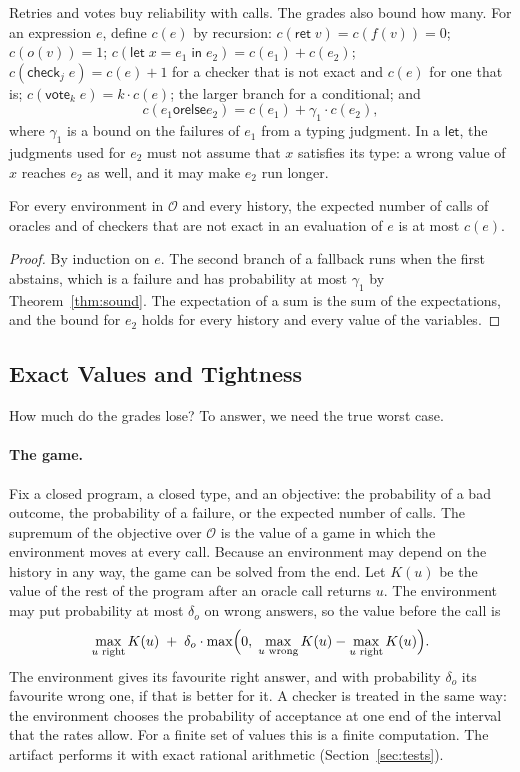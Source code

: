 \documentclass[acmsmall,nonacm,screen]{acmart}
\newcommand{\kw}[1]{\mathsf{#1}}
\newcommand{\ret}{\kw{ret}}
\newcommand{\letin}[3]{\kw{let}\;#1 = #2\;\kw{in}\;#3}
\newcommand{\chk}[2]{\kw{check}_{#1}\;#2}
\newcommand{\vote}[2]{\kw{vote}_{#1}\;#2}
\newcommand{\orelse}{\mathbin{\kw{orelse}}}
\newcommand{\cO}{\mathcal{O}}
\begin{document}
Retries and votes buy reliability with calls. The grades also bound how many. For an
expression $e$, define $c(e)$ by recursion: $c(\ret\;v) = c(f(v)) = 0$; $c(o(v)) = 1$;
$c(\letin{x}{e_1}{e_2}) = c(e_1) + c(e_2)$; $c(\chk{j}{e}) = c(e) + 1$ for a checker that is
not exact and $c(e)$ for one that is; $c(\vote{k}{e}) = k \cdot c(e)$; the larger branch for
a conditional; and
\[
c(e_1 \orelse e_2) = c(e_1) + \gamma_1 \cdot c(e_2),
\]
where $\gamma_1$ is a bound on the failures of $e_1$ from a typing judgment. In a
$\kw{let}$, the judgments used for $e_2$ must not assume that $x$ satisfies its type: a wrong
value of $x$ reaches $e_2$ as well, and it may make $e_2$ run longer.

\begin{proposition}[Calls]
\label{prop:calls}
For every environment in $\cO$ and every history, the expected number of calls of oracles and
of checkers that are not exact in an evaluation of $e$ is at most $c(e)$.
\end{proposition}

\begin{proof}
By induction on $e$. The second branch of a fallback runs when the first abstains, which is
a failure and has probability at most $\gamma_1$ by Theorem~\ref{thm:sound}. The expectation
of a sum is the sum of the expectations, and the bound for $e_2$ holds for every history and
every value of the variables.
\end{proof}

\subsection{Exact Values and Tightness}
\label{sec:tight}

How much do the grades lose? To answer, we need the true worst case.

\paragraph{The game.} Fix a closed program, a closed type, and an objective: the probability
of a bad outcome, the probability of a failure, or the expected number of calls. The
supremum of the objective over $\cO$ is the value of a game in which the environment moves
at every call. Because an environment may depend on the history in any way, the game can be
solved from the end. Let $K(u)$ be the value of the rest of the program after an oracle call
returns $u$. The environment may put probability at most $\delta_o$ on wrong answers, so the
value before the call is
\[
\max_{u \text{ right}} K(u) \;+\; \delta_o \cdot
\max\Bigl(0,\; \max_{u \text{ wrong}} K(u) - \max_{u \text{ right}} K(u)\Bigr) .
\]
The environment gives its favourite right answer, and with probability $\delta_o$ its
favourite wrong one, if that is better for it. A checker is treated in the same way: the
environment chooses the probability of acceptance at one end of the interval that the rates
allow. For a finite set of values this is a finite computation. The artifact performs it
with exact rational arithmetic (Section~\ref{sec:tests}).
\end{document}
